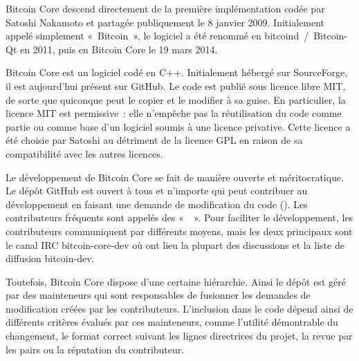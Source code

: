 Bitcoin Core descend directement de la première implémentation codée par Satoshi Nakamoto et partagée publiquement le 8 janvier 2009. Initialement appelé simplement «~Bitcoin~», le logiciel a été renommé en bitcoind~/~Bitcoin-Qt en 2011, puis en Bitcoin Core le 19 mars 2014.

Bitcoin Core est un logiciel codé en C++. Initialement hébergé sur SourceForge, il est aujourd'hui présent sur GitHub. Le code est publié sous licence libre MIT, de sorte que quiconque peut le copier et le modifier à sa guise. En particulier, la licence MIT est permissive~: elle n'empêche pas la réutilisation du code comme partie ou comme base d'un logiciel soumis à une licence privative. Cette licence a été choisie par Satoshi au détriment de la licence GPL en raison de sa compatibilité avec les autres licences.

Le développement de Bitcoin Core se fait de manière ouverte et méritocratique. Le dépôt GitHub est ouvert à tous et n'importe qui peut contribuer au développement en faisant une demande de modification du code (). Les contributeurs fréquents sont appelés des «~~». Pour faciliter le développement, les contributeurs communiquent par différents moyens, mais les deux principaux sont le canal IRC bitcoin-core-dev où ont lieu la plupart des discussions et la liste de diffusion bitcoin-dev.

Toutefois, Bitcoin Core dispose d'une certaine hiérarchie. Ainsi le dépôt est géré par des mainteneurs qui sont responsables de fusionner les demandes de modification créées par les contributeurs. L'inclusion dans le code dépend ainsi de différents critères évalués par ces mainteneurs, comme l'utilité démontrable du changement, le format correct suivant les lignes directrices du projet, la revue par les pairs ou la réputation du contributeur. %

